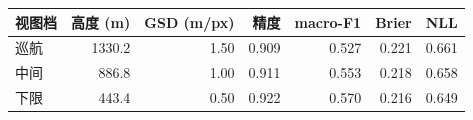 \begin{tabular}{lrrrrrr}
\hline
视图档 & 高度 (m) & GSD (m/px) & 精度 & macro-F1 & Brier & NLL \\
\hline
巡航 & 1330.2 & 1.50 & 0.909 & 0.527 & 0.221 & 0.661 \\
中间 & 886.8 & 1.00 & 0.911 & 0.553 & 0.218 & 0.658 \\
下限 & 443.4 & 0.50 & 0.922 & 0.570 & 0.216 & 0.649 \\
\hline
\end{tabular}
